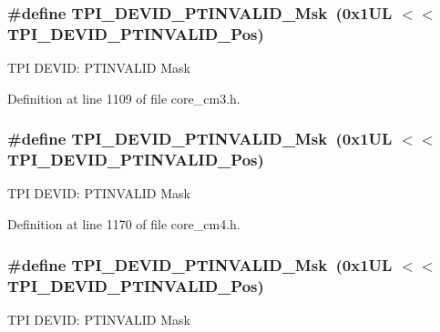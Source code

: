 \subsubsection[{\texorpdfstring{T\+P\+I\+\_\+\+D\+E\+V\+I\+D\+\_\+\+P\+T\+I\+N\+V\+A\+L\+I\+D\+\_\+\+Msk}{TPI_DEVID_PTINVALID_Msk}}]{\setlength{\rightskip}{0pt plus 5cm}\#define T\+P\+I\+\_\+\+D\+E\+V\+I\+D\+\_\+\+P\+T\+I\+N\+V\+A\+L\+I\+D\+\_\+\+Msk~(0x1\+U\+L $<$$<$ T\+P\+I\+\_\+\+D\+E\+V\+I\+D\+\_\+\+P\+T\+I\+N\+V\+A\+L\+I\+D\+\_\+\+Pos)}\hypertarget{group___c_m_s_i_s___t_p_i_ga1ca84d62243e475836bba02516ba6b97}{}\label{group___c_m_s_i_s___t_p_i_ga1ca84d62243e475836bba02516ba6b97}
T\+PI D\+E\+V\+ID\+: P\+T\+I\+N\+V\+A\+L\+ID Mask 

Definition at line 1109 of file core\+\_\+cm3.\+h.

\subsubsection[{\texorpdfstring{T\+P\+I\+\_\+\+D\+E\+V\+I\+D\+\_\+\+P\+T\+I\+N\+V\+A\+L\+I\+D\+\_\+\+Msk}{TPI_DEVID_PTINVALID_Msk}}]{\setlength{\rightskip}{0pt plus 5cm}\#define T\+P\+I\+\_\+\+D\+E\+V\+I\+D\+\_\+\+P\+T\+I\+N\+V\+A\+L\+I\+D\+\_\+\+Msk~(0x1\+U\+L $<$$<$ T\+P\+I\+\_\+\+D\+E\+V\+I\+D\+\_\+\+P\+T\+I\+N\+V\+A\+L\+I\+D\+\_\+\+Pos)}\hypertarget{group___c_m_s_i_s___t_p_i_ga1ca84d62243e475836bba02516ba6b97}{}\label{group___c_m_s_i_s___t_p_i_ga1ca84d62243e475836bba02516ba6b97}
T\+PI D\+E\+V\+ID\+: P\+T\+I\+N\+V\+A\+L\+ID Mask 

Definition at line 1170 of file core\+\_\+cm4.\+h.

\subsubsection[{\texorpdfstring{T\+P\+I\+\_\+\+D\+E\+V\+I\+D\+\_\+\+P\+T\+I\+N\+V\+A\+L\+I\+D\+\_\+\+Msk}{TPI_DEVID_PTINVALID_Msk}}]{\setlength{\rightskip}{0pt plus 5cm}\#define T\+P\+I\+\_\+\+D\+E\+V\+I\+D\+\_\+\+P\+T\+I\+N\+V\+A\+L\+I\+D\+\_\+\+Msk~(0x1\+U\+L $<$$<$ T\+P\+I\+\_\+\+D\+E\+V\+I\+D\+\_\+\+P\+T\+I\+N\+V\+A\+L\+I\+D\+\_\+\+Pos)}\hypertarget{group___c_m_s_i_s___t_p_i_ga1ca84d62243e475836bba02516ba6b97}{}\label{group___c_m_s_i_s___t_p_i_ga1ca84d62243e475836bba02516ba6b97}
T\+PI D\+E\+V\+ID\+: P\+T\+I\+N\+V\+A\+L\+ID Mask 

